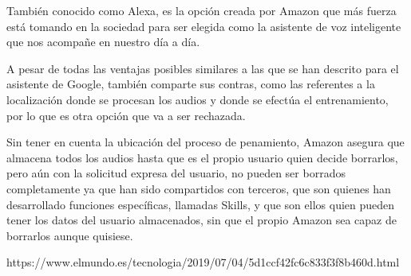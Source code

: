 También conocido como Alexa, es la opción creada por Amazon que más fuerza está tomando en la sociedad para ser elegida como la asistente de voz inteligente que nos acompañe en nuestro día a día.

A pesar de todas las ventajas posibles similares a las que se han descrito para el asistente de Google, también comparte sus contras, como las referentes a la localización donde se procesan los audios y donde se efectúa el entrenamiento, por lo que es otra opción que va a ser rechazada.

Sin tener en cuenta la ubicación del proceso de penamiento, Amazon asegura que almacena todos los audios hasta que es el propio usuario quien decide borrarlos, pero aún con la solicitud expresa del usuario, no pueden ser borrados completamente ya que han sido compartidos con terceros, que son quienes han desarrollado funciones específicas, llamadas Skills, y que son ellos quien pueden tener los datos del usuario almacenados, sin que el propio Amazon sea capaz de borrarlos aunque quisiese.

https://www.elmundo.es/tecnologia/2019/07/04/5d1ccf42fc6c833f3f8b460d.html